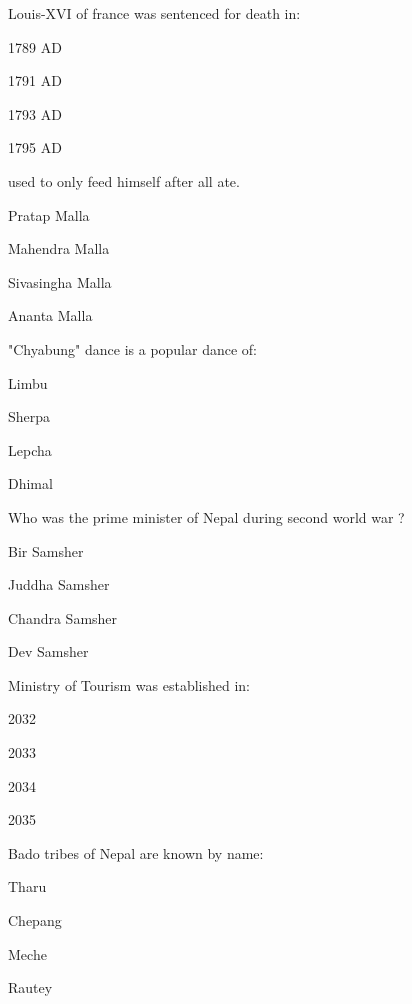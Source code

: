\begin{questions}
\question Louis-XVI of france was sentenced for death in:
  \begin{items}
  \item 1789 AD
  \item 1791 AD
  \item* 1793 AD
  \item 1795 AD
  \end{items}

\question \fillin[][2cm] used to only feed himself after all ate.
  \begin{items}
  \item Pratap Malla
  \item* Mahendra Malla
  \item Sivasingha Malla
  \item Ananta Malla
  \end{items}

\question "Chyabung" dance is a popular dance of:
  \begin{items}
  \item* Limbu
  \item Sherpa
  \item Lepcha
  \item Dhimal
  \end{items}

\question Who was the prime minister of Nepal during second world war ?
  \begin{items}
  \item Bir Samsher
  \item Juddha Samsher
  \item* Chandra Samsher
  \item Dev Samsher
  \end{items}

\question Ministry of Tourism was established in:
  \begin{items}
  \item 2032
  \item* 2033
  \item 2034
  \item 2035
  \end{items}

\question Bado tribes of Nepal are known by name:
  \begin{items}
  \item Tharu
  \item Chepang
  \item* Meche
  \item Rautey
  \end{items}


\end{questions}
